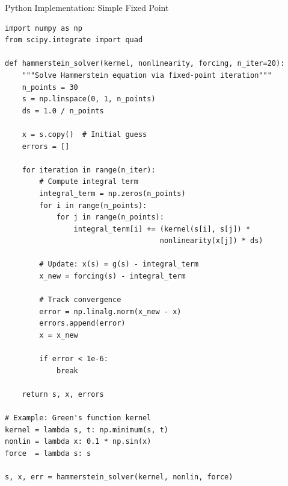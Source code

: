 \documentclass[aspectratio=169,10pt]{beamer}
\begin{document}
\begin{frame}[fragile]{Python Implementation: Simple Fixed Point}
    \begin{lstlisting}
import numpy as np
from scipy.integrate import quad

def hammerstein_solver(kernel, nonlinearity, forcing, n_iter=20):
    """Solve Hammerstein equation via fixed-point iteration"""
    n_points = 30
    s = np.linspace(0, 1, n_points)
    ds = 1.0 / n_points

    x = s.copy()  # Initial guess
    errors = []

    for iteration in range(n_iter):
        # Compute integral term
        integral_term = np.zeros(n_points)
        for i in range(n_points):
            for j in range(n_points):
                integral_term[i] += (kernel(s[i], s[j]) *
                                    nonlinearity(x[j]) * ds)

        # Update: x(s) = g(s) - integral_term
        x_new = forcing(s) - integral_term

        # Track convergence
        error = np.linalg.norm(x_new - x)
        errors.append(error)
        x = x_new

        if error < 1e-6:
            break

    return s, x, errors

# Example: Green's function kernel
kernel = lambda s, t: np.minimum(s, t)
nonlin = lambda x: 0.1 * np.sin(x)
force  = lambda s: s

s, x, err = hammerstein_solver(kernel, nonlin, force)
    \end{lstlisting}
\end{frame}
\end{document}
